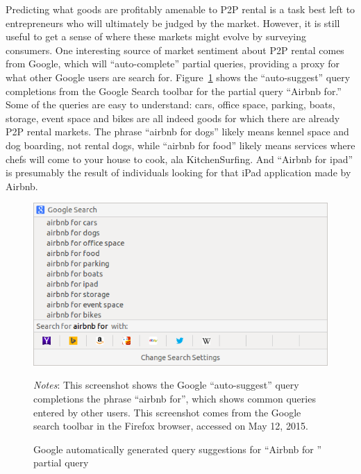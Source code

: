 \documentclass[11pt]{article}
\begin{document}
Predicting what goods are profitably amenable to P2P rental is a task best left to entrepreneurs who will ultimately be judged by the market. 
However, it is still useful to get a sense of where these markets might evolve by surveying consumers. 
One interesting source of market sentiment about P2P rental comes from Google, which will ``auto-complete'' partial queries, providing a proxy for what other Google users are search for. 
Figure~\ref{fig:auto} shows the ``auto-suggest'' query completions from the Google Search toolbar for the partial query ``Airbnb for.''
Some of the queries are easy to understand: 
cars, office space, parking, boats, storage, event space and bikes are all indeed goods for which there are already P2P rental markets. 
The phrase ``airbnb for dogs'' likely means kennel space and dog boarding, not rental dogs, while ``airbnb for food'' likely means services where chefs will come to your house to cook, ala KitchenSurfing. 
And ``Airbnb for ipad'' is presumably the result of individuals looking for that iPad application made by Airbnb. 

\begin{figure}
\centering 
\caption{Google automatically generated query suggestions for ``Airbnb for '' partial query}
\label{fig:auto} 
\begin{minipage}{0.70 \linewidth}
  \includegraphics[width = \linewidth]{./images/airbnb_for_x.png} \\
  \begin{footnotesize}
  \emph{Notes}: This screenshot shows the Google ``auto-suggest'' query completions the phrase ``airbnb for'', which shows common queries entered by other users.
  This screenshot comes from the Google search toolbar in the Firefox browser, accessed on May 12, 2015.
  \end{footnotesize}
\end{minipage}
\end{figure} 
\end{document}
